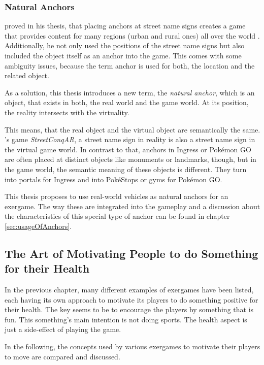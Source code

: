 \subsubsection{Natural Anchors}
\citeauthor{hock2014augmented} proved in his thesis, that placing anchors at street name signs creates a game that provides content for many regions (urban and rural ones) all over the world \cite{hock2014augmented}. Additionally, he not only used the positions of the street name signs but also included the object itself as an anchor into the game. This comes with some ambiguity issues, because the term anchor is used for both, the location and the related object.

As a solution, this thesis introduces a new term, the \emph{natural anchor}, which is an object, that exists in both, the real world and the game world. At its position, the reality intersects with the virtuality.

This means, that the real object and the virtual object are semantically the same. \citep{hock2014augmented}'s game \emph{StreetConqAR}, a street name sign in reality is also a street name sign in the virtual game world. In contrast to that, anchors in Ingress or Pok\'{e}mon GO are often placed at distinct objects like monuments or landmarks, though, but in the game world, the semantic meaning of these objects is different. They turn into portals for Ingress and into Pok\'{e}Stops or gyms for Pok\'{e}mon GO.

This thesis proposes to use real-world vehicles as natural anchors for an exergame. The way these are integrated into the gameplay and a discussion about the characteristics of this special type of anchor can be found in chapter \ref{sec:usageOfAnchors}.

\subsection{The Art of Motivating People to do Something for their Health}
In the previous chapter, many different examples of exergames have been listed, each having its own approach to motivate its players to do something positive for their health. The key seems to be to encourage the players by something that is fun. This something's main intention is not doing sports. The health aspect is just a side-effect of playing the game.

In the following, the concepts used by various exergames to motivate their players to move are compared and discussed.

